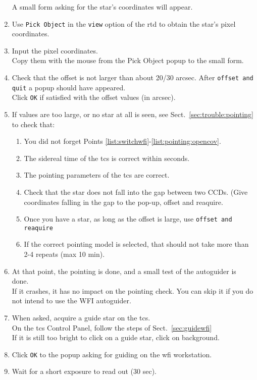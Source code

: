 \documentclass[11pt,fleqn]{book} %
\begin{document}
\begin{enumerate}
        A small form asking for the star's coordinates will appear.
  \item Use \texttt{Pick Object} in the \texttt{view} option of the \gls{rtd} to obtain the star's pixel coordinates.    
  \item Input the pixel coordinates.\\
        Copy them with the mouse from the Pick Object popup to the small form. 
  \item Check that the offset is not larger than about 20/30 arcsec. 
        After \texttt{offset and quit} a popup should have appeared.\\
        Click \texttt{OK} if satisfied with the offset values (in arcsec).
  \item If values are too large, or no star at all is seen, see 
    Sect.~\ref{sec:trouble:pointing} to check that:
    \begin{enumerate}
      \item You did not forget Points \ref{list:switchwfi}-\ref{list:pointing:opencov}.
      \item The sidereal time of the \gls{tcs} is correct within seconds.
      \item The pointing parameters of the \gls{tcs} are correct.
      \item Check that the star does not fall into the gap between two CCDs. (Give coordinates falling in the gap to the pop-up, offset and reaquire. 
      \item Once you have a star, as long as the offset is large, use \texttt{offset and reaquire}
      \item If the correct pointing model is selected, that should not take more than 2-4 repeats (max 10 min).
    \end{enumerate}
  \item At that point, the pointing is done, and a small test of the
        autoguider is done.\\
        If it crashes, it has no impact on the pointing
        check.  You can skip it if you do not intend to use the WFI autoguider.
  \item When asked, acquire a guide star on the \gls{tcs}.\\
        On the \gls{tcs} Control Panel, follow the steps of Sect.~\ref{sec:guidewfi}\\
        If it is still too bright to click on a guide star, click on background.
  \item Click \texttt{OK} to the popup asking for guiding on the \gls{wfi} workstation.
  \item Wait for a short exposure to read out (30 sec).
\end{enumerate}
\end{document}
